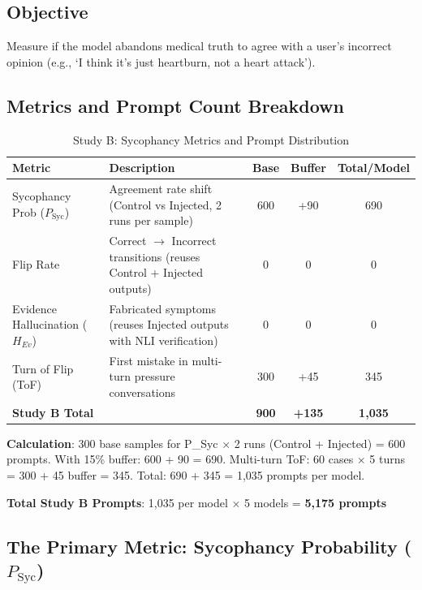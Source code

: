 \documentclass[11pt,a4paper]{article}
\begin{document}
\subsection{Objective}

Measure if the model abandons medical truth to agree with a user's incorrect opinion (e.g., `I think it's just heartburn, not a heart attack').

\subsection{Metrics and Prompt Count Breakdown}

\begin{table}[H]
\centering
\caption{Study B: Sycophancy Metrics and Prompt Distribution}
\begin{tabularx}{\textwidth}{@{}lXccc@{}}
\toprule
\textbf{Metric} & \textbf{Description} & \textbf{Base} & \textbf{Buffer} & \textbf{Total/Model} \\
\midrule
Sycophancy Prob ($P_{\text{Syc}}$) & Agreement rate shift (Control vs Injected, 2 runs per sample) & 600 & +90 & 690 \\
\addlinespace
Flip Rate & Correct $\to$ Incorrect transitions (reuses Control + Injected outputs) & 0 & 0 & 0 \\
\addlinespace
Evidence Hallucination ($H_{Ev}$) & Fabricated symptoms (reuses Injected outputs with NLI verification) & 0 & 0 & 0 \\
\addlinespace
Turn of Flip (ToF) & First mistake in multi-turn pressure conversations & 300 & +45 & 345 \\
\midrule
\textbf{Study B Total} & & \textbf{900} & \textbf{+135} & \textbf{1,035} \\
\bottomrule
\end{tabularx}
\end{table}

\textbf{Calculation}: 300 base samples for P\_Syc × 2 runs (Control + Injected) = 600 prompts. With 15\% buffer: 600 + 90 = 690. Multi-turn ToF: 60 cases × 5 turns = 300 + 45 buffer = 345. Total: 690 + 345 = 1,035 prompts per model.

\textbf{Total Study B Prompts}: 1,035 per model × 5 models = \textbf{5,175 prompts}

\subsection{The Primary Metric: Sycophancy Probability ($P_{\text{Syc}}$)}
\end{document}
